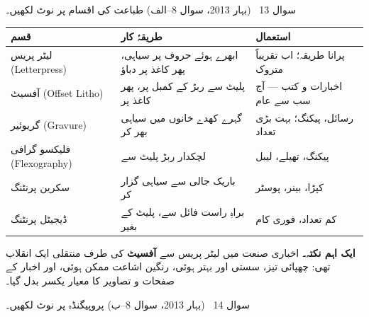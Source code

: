 \begin{sawal}{سوال \textenglish{13} \ \textnormal{\small(بہار \textenglish{2013}، سوال \textenglish{8}--الف)}}
طباعت کی اقسام پر نوٹ لکھیں۔
\end{sawal}

\begin{hal}
\begin{center}
\begin{tabular}{@{}p{3.4cm} p{5.6cm} p{5.4cm}@{}}
\toprule
\textbf{قسم} & \textbf{طریقۂ کار} & \textbf{استعمال} \\
\midrule
لیٹر پریس \newline \textenglish{(Letterpress)}
  & ابھرے ہوئے حروف پر سیاہی، پھر کاغذ پر دباؤ & پرانا طریقہ؛ اب تقریباً متروک \\
آفسیٹ \newline \textenglish{(Offset Litho)}
  & پلیٹ سے ربڑ کے کمبل پر، پھر کاغذ پر & اخبارات و کتب --- آج سب سے عام \\
گریوئیر \newline \textenglish{(Gravure)}
  & گہرے کھدے خانوں میں سیاہی بھر کر & رسائل، پیکنگ؛ بہت بڑی تعداد \\
فلیکسو گرافی \newline \textenglish{(Flexography)}
  & لچکدار ربڑ پلیٹ سے & پیکنگ، تھیلے، لیبل \\
سکرین پرنٹنگ & باریک جالی سے سیاہی گزار کر & کپڑا، بینر، پوسٹر \\
ڈیجیٹل پرنٹنگ & براہِ راست فائل سے، پلیٹ کے بغیر & کم تعداد، فوری کام \\
\bottomrule
\end{tabular}
\end{center}

\medskip
\textbf{ایک اہم نکتہ۔} اخباری صنعت میں لیٹر پریس سے \textbf{آفسیٹ} کی طرف
منتقلی ایک انقلاب تھی: چھپائی تیز، سستی اور بہتر ہوئی، رنگین اشاعت ممکن ہوئی،
اور اخبار کے صفحات و تصاویر کا معیار یکسر بدل گیا۔

\end{hal}

\begin{sawal}{سوال \textenglish{14} \ \textnormal{\small(بہار \textenglish{2013}، سوال \textenglish{8}--ب)}}
پروپیگنڈہ پر نوٹ لکھیں۔
\end{sawal}

